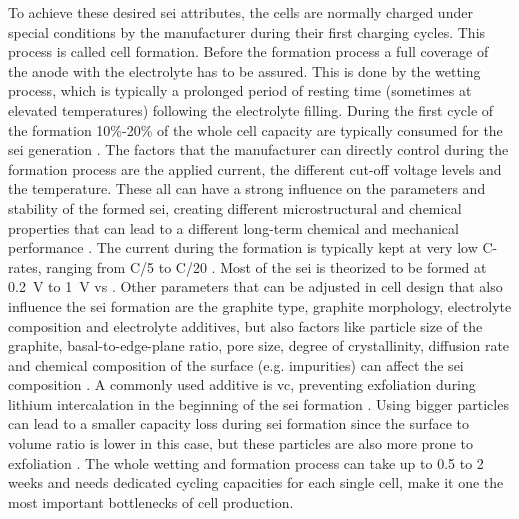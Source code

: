 To achieve these desired \gls{sei} attributes, the cells are normally charged under special conditions by the manufacturer during their first charging cycles. This process is called cell formation. Before the formation process a full coverage of the anode with the electrolyte has to be assured. This is done by the wetting process, which is typically a prolonged period of resting time (sometimes at elevated temperatures) following the electrolyte filling. During the first cycle of the formation 10\%-20\% of the whole cell capacity are typically consumed for the \gls{sei} generation \cite{Patil.2008,Lin.2016,Gallego.2014}. The factors that the manufacturer can directly control during the formation process are the applied current, the different cut-off voltage levels and the temperature. These all can have a strong influence on the parameters and stability of the formed \gls{sei}, creating different microstructural and chemical properties that can lead to a different long-term chemical and mechanical performance \cite{An.2016}. The current during the formation is typically kept at very low C-rates, ranging from C/5 to C/20 \cite{Wood.2015}. Most of the \gls{sei} is theorized to be formed at \SI{0.2}{\volt} to \SI{1}{\volt} vs  \cite{An.2016}. Other parameters that can be adjusted in cell design that also influence the \gls{sei} formation are the graphite type, graphite morphology, electrolyte composition and electrolyte additives, but also factors like particle size of the graphite, basal-to-edge-plane ratio, pore size, degree of crystallinity,  diffusion rate and chemical composition of the surface (e.g. impurities) can affect the \gls{sei} composition \cite{An.2016,Seidl.2016,Bhattacharya.2012}. A commonly used additive is \gls{vc}, preventing exfoliation during lithium intercalation in the beginning of the \gls{sei} formation \cite{Aurbach.1998,Flandrois.1999,Tasaki.2006}. Using bigger particles can lead to a smaller capacity loss during \gls{sei} formation since the surface to volume ratio is lower in this case, but these particles are also more prone to exfoliation \cite{An.2016}. The whole wetting and formation process can take up to 0.5 to 2 weeks \cite{Wood.2015} and needs dedicated cycling capacities for each single cell, make it one the most important bottlenecks of cell production. \par
